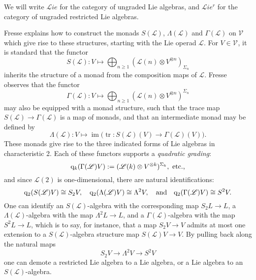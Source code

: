 \documentclass[11pt]{amsart} \renewcommand{\baselinestretch}{1.2}
\theoremstyle{plain}
\numberwithin{equation}{section} %
\theoremstyle{plain}
\numberwithin{equation}{chapter} %
\DeclareMathOperator{\im}{im}
\DeclareMathOperator{\trace}{tr}
\renewcommand{\to}{\longrightarrow}
\newcommand{\scrL}{\mathscr{L}}
\newcommand{\calV}{\mathcal{V}}
\newcommand{\LieOperad}{{\scrL}}
\newcommand{\vect}[2]{\calV^{#1}_{#2}}
\newcommand{\quadgrad}[1]{\mathrm{q}_{#1}}
\newcommand{\liealgs}{{\scrL\!\textit{ie}}}
\newcommand{\restliealgs}{{\scrL\!\textit{ie}^\textit{r}}}
\renewcommand{\mapsto}{\longmapsto}
\begin{document}
\begin{Conventions and notation}
We will  write $\liealgs$ for the category of ungraded Lie algebras, and $\restliealgs$ for the category of ungraded restricted Lie algebras.

Fresse \cite{FresseSimplicialAlgs.pdf} explains how to construct the monads $S(\LieOperad)$, $\Lambda(\LieOperad)$ and $\Gamma(\LieOperad)$ on $\vect{}{}$ which give rise to these structures, starting with the Lie operad $\LieOperad$. For $V\in\vect{}{}$, it is standard that the functor
\[S(\LieOperad):V\mapsto \bigoplus_{n\geq1}(\LieOperad(n)\otimes V^{\otimes n})_{\Sigma_n}\]
inherits the structure of a monad from the composition maps of $\LieOperad$. Fresse observes that the functor
\[\Gamma(\LieOperad):V\mapsto \bigoplus_{n\geq1}(\LieOperad(n)\otimes V^{\otimes n})^{\Sigma_n}\]
may also be equipped with a monad structure, such that the trace map $S(\LieOperad)\to \Gamma(\LieOperad)$
is a map of monads, and that an intermediate monad may be defined by
\[\Lambda(\LieOperad):V\mapsto\im\bigl(\trace:S(\LieOperad)(V)\to \Gamma(\LieOperad)(V)\bigr).\]
These monads give rise to the three indicated forms of Lie algebras in characteristic 2. Each of these functors supports a \emph{quadratic grading}:
\[\quadgrad{k}(\Gamma(\LieOperad)V):=(\LieOperad(k)\otimes V^{\otimes k})^{\Sigma_k},\textup{ etc.,}\]
and since $\LieOperad(2)$ is one-dimensional, there are natural identifications:
\[\quadgrad{2}(S(\LieOperad)V)\cong S_2V,\quad \quadgrad{2}(\Lambda(\LieOperad)V)\cong \Lambda^2V,\quad\textup{and}\quad\quadgrad{2}(\Gamma(\LieOperad)V)\cong S^2V.\]
One can identify an $S(\LieOperad)$-algebra with the corresponding map $S_2L\to L$, a $\Lambda(\LieOperad)$-algebra with the map $\Lambda^2L\to L$, and a $\Gamma(\LieOperad)$-algebra with the map $S^2L\to L$, which is to say, for instance, that a map $S_2V\to V$ admits at most one extension to a $S(\LieOperad)$-algebra structure map $S(\LieOperad)V\to V$. %
By pulling back along the natural maps
\[S_2V\to \Lambda^2 V\to S^2V\]
one can demote a restricted Lie algebra to a Lie algebra, or a Lie algebra to an $S(\LieOperad)$-algebra.


\end{Conventions and notation}
\end{document}

